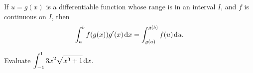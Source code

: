 \setcounter{chapter}{5}
\setcounter{section}{6}
\setcounter{theorem}{0}
\setcounter{equation}{0}


%
%

\begin{theorem}
If $u=g(x)$ is a differentiable function whose range is in an interval $I$, and $f$ is continuous on $I$, then
\begin{equation*}
\int_a^b f(g(x))g'(x)\mkern 2mu \mathrm{d} x = \int_{g(a)}^{g(b)} f(u)\mkern 2mu \mathrm{d} u.
\end{equation*}
\end{theorem}

\begin{example}
Evaluate $\displaystyle\int_{-1}^13x^2\sqrt{x^3+1}\mkern 2mu \mathrm{d} x$.
\end{example}

